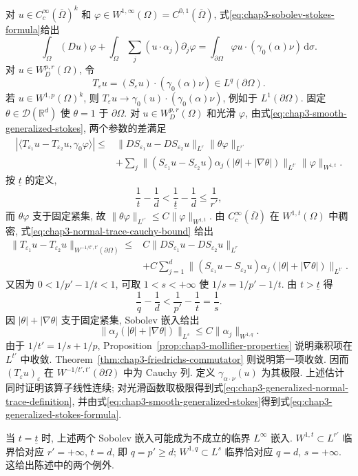 \begin{Proof}
对 $u\in C_c^\infty(\overline\Omega)^k$ 和 $\varphi\in W^{1,\infty}(\Omega)=C^{0,1}(\overline\Omega)$, 式\eqref{eq:chap3-sobolev-stokes-formula}给出
\begin{equation}
 \int_\Omega(Du)\varphi+\int_\Omega\sum_j(u\cdot\alpha_j)\partial_j\varphi
 =\int_{\partial\Omega}\varphi u\cdot(\gamma_0(\alpha)\nu)\,\mathrm d\sigma.
 \label{eq:chap3-smooth-generalized-stokes}
\end{equation}
对 $u\in W_D^{p,r}(\Omega)$, 令
\[
 T_\varepsilon u=(S_\varepsilon u)\cdot(\gamma_0(\alpha)\nu)
 \in L^q(\partial\Omega).
\]
若 $u\in W^{1,p}(\Omega)^k$, 则 $T_\varepsilon u\to\gamma_0(u)\cdot(\gamma_0(\alpha)\nu)$, 例如于 $L^1(\partial\Omega)$. 固定 $\theta\in\mathcal D(\mathbb R^d)$ 使 $\theta=1$ 于 $\partial\Omega$. 对 $u\in W_D^{p,r}(\Omega)$ 和光滑 $\varphi$, 由式\eqref{eq:chap3-smooth-generalized-stokes}, 两个参数的差满足
\begin{equation}
 \begin{split}
 |\langle T_{\varepsilon_1}u-T_{\varepsilon_2}u,\gamma_0\varphi\rangle|
 \leq{}&\|DS_{\varepsilon_1}u-DS_{\varepsilon_2}u\|_{L^r}\|\theta\varphi\|_{L^{r'}}\\
 &+\sum_j\|(S_{\varepsilon_1}u-S_{\varepsilon_2}u)\alpha_j(|\theta|+|\nabla\theta|)\|_{L^{t'}}
 \|\varphi\|_{W^{1,t}}.
 \end{split}
 \label{eq:chap3-normal-trace-cauchy-bound}
\end{equation}
按 $\underline t$ 的定义,
\[
 \frac1t-\frac1d<\frac1{\underline t}-\frac1d\leq\frac1{r'},
\]
而 $\theta\varphi$ 支于固定紧集, 故 $\|\theta\varphi\|_{L^{r'}}\leq C\|\varphi\|_{W^{1,t}}$. 由 $C_c^\infty(\overline\Omega)$ 在 $W^{1,t}(\Omega)$ 中稠密, 式\eqref{eq:chap3-normal-trace-cauchy-bound} 给出
\begin{align*}
 \|T_{\varepsilon_1}u-T_{\varepsilon_2}u\|_{W^{-1/t',t'}(\partial\Omega)}
 \leq{}&C\|DS_{\varepsilon_1}u-DS_{\varepsilon_2}u\|_{L^r}\\
 &+C\sum_{j=1}^d\|(S_{\varepsilon_1}u-S_{\varepsilon_2}u)
 \alpha_j(|\theta|+|\nabla\theta|)\|_{L^{t'}}.
\end{align*}
又因为 $0<1/p'-1/t<1$, 可取 $1<s<+\infty$ 使 $1/s=1/p'-1/t$. 由 $t>\underline t$ 得
\[
 \frac1q-\frac1d<\frac1{p'}-\frac1t=\frac1s.
\]
因 $|\theta|+|\nabla\theta|$ 支于固定紧集, Sobolev 嵌入给出
\[
 \|\alpha_j(|\theta|+|\nabla\theta|)\|_{L^s}
 \leq C\|\alpha_j\|_{W^{1,q}}.
\]
由于 $1/t'=1/s+1/p$, Proposition~\ref{prop:chap3-mollifier-properties} 说明乘积项在 $L^{t'}$ 中收敛. Theorem~\ref{thm:chap3-friedrichs-commutator} 则说明第一项收敛. 因而 $(T_\varepsilon u)_\varepsilon$ 在 $W^{-1/t',t'}(\partial\Omega)$ 中为 Cauchy 列. 定义 $\gamma_{\alpha\cdot\nu}(u)$ 为其极限. 上述估计同时证明该算子线性连续; 对光滑函数取极限得到式\eqref{eq:chap3-generalized-normal-trace-definition}, 并由式\eqref{eq:chap3-smooth-generalized-stokes}得到式\eqref{eq:chap3-generalized-stokes-formula}.

当 $t=\underline t$ 时, 上述两个 Sobolev 嵌入可能成为不成立的临界 $L^\infty$ 嵌入. $W^{1,t}\subset L^{r'}$ 临界恰对应 $r'=+\infty$, $t=d$, 即 $q=p'\geq d$; $W^{1,q}\subset L^s$ 临界恰对应 $q=d$, $s=+\infty$. 这给出陈述中的两个例外.
\end{Proof}

